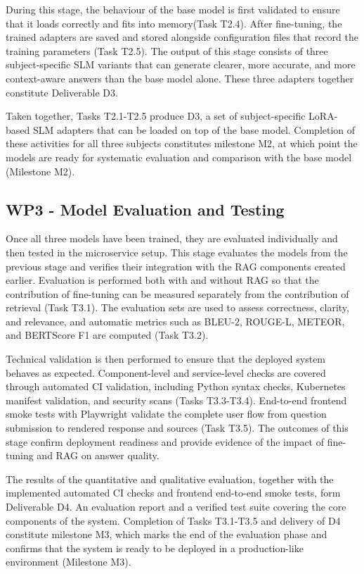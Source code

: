 During this stage, the behaviour of the base model is first validated to ensure that it loads correctly and fits into memory(Task T2.4). After fine-tuning, the trained adapters are saved and stored alongside configuration files that record the training parameters (Task T2.5). The output of this stage consists of three subject-specific SLM variants that can generate clearer, more accurate, and more context-aware answers than the base model alone. These three adapters together constitute Deliverable D3.

Taken together, Tasks T2.1-T2.5 produce D3, a set of subject-specific LoRA-based SLM adapters that can be loaded on top of the base model. Completion of these activities for all three subjects constitutes milestone M2, at which point the models are ready for systematic evaluation and comparison with the base model (Milestone M2).

\subsection{WP3 - Model Evaluation and Testing}

Once all three models have been trained, they are evaluated individually and then tested in the microservice setup. This stage evaluates the models from the previous stage and verifies their integration with the RAG components created earlier. Evaluation is performed both with and without RAG so that the contribution of fine-tuning can be measured separately from the contribution of retrieval (Task T3.1). The evaluation sets are used to assess correctness, clarity, and relevance, and automatic metrics such as BLEU-2, ROUGE-L, METEOR, and BERTScore F1 are computed (Task T3.2).

Technical validation is then performed to ensure that the deployed system behaves as expected. Component-level and service-level checks are covered through automated CI validation, including Python syntax checks, Kubernetes manifest validation, and security scans (Tasks T3.3-T3.4). End-to-end frontend smoke tests with Playwright validate the complete user flow from question submission to rendered response and sources (Task T3.5). The outcomes of this stage confirm deployment readiness and provide evidence of the impact of fine-tuning and RAG on answer quality.

The results of the quantitative and qualitative evaluation, together with the implemented automated CI checks and frontend end-to-end smoke tests, form Deliverable D4. An evaluation report and a verified test suite covering the core components of the system. Completion of Tasks T3.1-T3.5 and delivery of D4 constitute milestone M3, which marks the end of the evaluation phase and confirms that the system is ready to be deployed in a production-like environment (Milestone M3).


